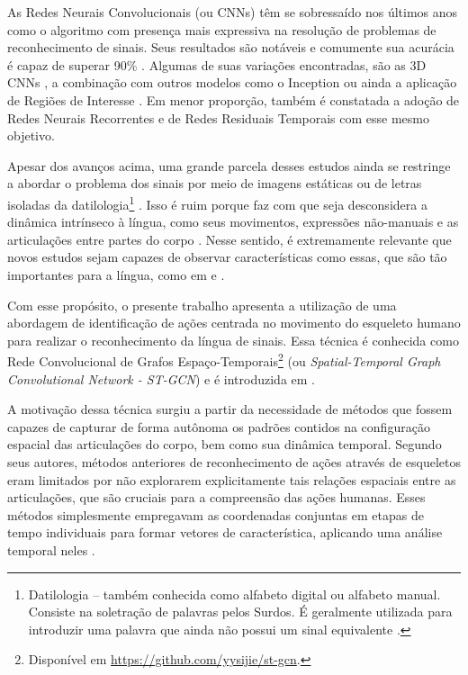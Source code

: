 As Redes Neurais Convolucionais (ou CNNs) têm se sobressaído nos últimos anos como o algoritmo com presença mais expressiva na resolução de problemas de reconhecimento de sinais. Seus resultados são notáveis e comumente sua acurácia é capaz de superar 90\%  \cite{shanta-2018, ji-2017, taskiran-2018, rao-2018}. Algumas de suas variações encontradas, são as 3D CNNs \cite{elbadawy-2017}, a combinação com outros modelos como o Inception \cite{das-2018} ou ainda a aplicação de Regiões de Interesse \cite{sajanraj-2018}. Em menor proporção, também é constatada a adoção de Redes Neurais Recorrentes \cite{konstantinidis-2018} e de Redes Residuais Temporais \cite{pigou-2017} com esse mesmo objetivo.

Apesar dos avanços acima, uma grande parcela desses estudos ainda se restringe a abordar o problema dos sinais por meio de imagens estáticas ou de letras isoladas da datilologia\footnote{
     Datilologia – também conhecida como alfabeto digital ou alfabeto manual. Consiste na soletração de palavras pelos Surdos. É geralmente utilizada para introduzir uma palavra que ainda não possui um sinal equivalente \cite{quadros-2004, pereira-choi-2011}.
} \cite{shanta-2018, taskiran-2018, elbadawy-2017, das-2018, sajanraj-2018}. Isso é ruim porque faz com que seja desconsidera a dinâmica intrínseco à língua, como seus movimentos, expressões não-manuais e as articulações entre partes do corpo \cite{quadros-2004}. Nesse sentido, é extremamente relevante que novos estudos sejam capazes de observar características como essas, que são tão importantes para a língua, como em \cite{konstantinidis-2018} e \cite{pigou-2017}. 

Com esse propósito, o presente trabalho apresenta a utilização de uma abordagem de identificação de ações centrada no movimento do esqueleto humano para realizar o reconhecimento da língua de sinais. Essa técnica é conhecida como Rede Convolucional de Grafos Espaço-Temporais\footnote{
    Disponível em \url{https://github.com/yysijie/st-gcn}.
} (ou \textit{Spatial-Temporal Graph Convolutional Network - ST-GCN}) e é introduzida em \cite{st-gcn-2018}. 

A motivação dessa técnica surgiu a partir da necessidade de métodos que fossem capazes de capturar de forma autônoma os padrões contidos na configuração espacial das articulações do corpo, bem como sua dinâmica temporal. Segundo seus autores, métodos anteriores de reconhecimento de ações através de esqueletos eram limitados por não explorarem explicitamente tais relações espaciais entre as articulações, que são cruciais para a compreensão das ações humanas. Esses métodos simplesmente empregavam as coordenadas conjuntas em etapas de tempo individuais para formar vetores de característica, aplicando uma análise temporal neles \cite{st-gcn-2018, wang-2012, fernando-2015}.

